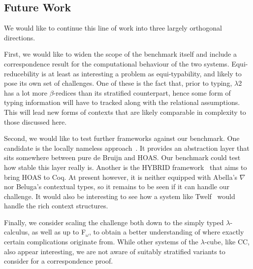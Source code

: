 \documentclass[a4paper,UKenglish]{lipics-v2016}
\newcommand{\SysL}{$\lambda$2\xspace}
\theoremstyle{plain}
\begin{document}
\subsection{Future Work}
\label{sec:future-work}

We would like to continue this line of work into three largely orthogonal directions.

First, we would like to widen the scope of the benchmark itself and include a correspondence result for the computational behaviour of the two systems.
Equi-reducebility is at least as interesting a problem as equi-typability, and likely to pose its own set of challenges.
One of these is the fact that, prior to typing, \SysL has a lot more $\beta$-redices than its stratified counterpart, hence some form of typing information will have to tracked along with the relational assumptions.
This will lead new forms of contexts that are likely comparable in complexity to those discussed here.

Second, we would like to test further frameworks against our benchmark.
One candidate is the locally nameless approach~\cite{DBLP:conf/popl/AydemirCPPW08}.
It provides an abstraction layer that sits somewhere between pure de Bruijn and HOAS.
Our benchmark could test how stable this layer really is.
Another is the HYBRID framework~\cite{Capretta2007, Capretta2009, DBLP:journals/jar/FeltyM12} that aims to bring HOAS to Coq.
At present however, it is neither equipped with Abella's $\nabla$ nor Beluga's contextual types, so it remains to be seen if it can handle our challenge.
It would also be interesting to see how a system like Twelf~\cite{DBLP:conf/cade/PfenningS99} would handle the rich context structures.

Finally, we consider scaling the challenge both down to the simply typed $\lambda$-calculus, as well as up to F$_\omega$, to obtain a better understanding of where exactly certain complications originate from.
While other systems of the $\lambda$-cube, like CC, also appear interesting, we are not aware of suitably stratified variants to consider for a correspondence proof.


 
\end{document}
